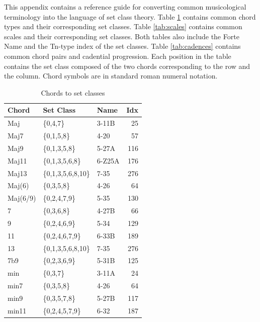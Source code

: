 \documentclass{article}
\begin{document}
This appendix contains a reference guide for converting common
musicological terminology into the language of set class theory. Table
\ref{tab:chords} contains common chord types and their corresponding
set classes. Table \ref{tab:scales} contains common scales and their
corresponding set classes. Both tables also include the Forte Name and
the Tn-type index of the set classes. Table \ref{tab:cadences}
contains common chord pairs and cadential progression. Each position
in the table contains the set class composed of the two chords
corresponding to the row and the column. Chord symbols are in standard
roman numeral notation.
\begin{table}[htb]
\caption{Chords to set classes} \label{tab:chords}
\begin{center}
\begin{tabular}{lllr}
\hline
 Chord           &  Set Class           &  Name    &  Idx  \\
\hline
 Maj             &  \{0,4,7\}           &  3-11B   &   25  \\
 Maj7            &  \{0,1,5,8\}         &  4-20    &   57  \\
 Maj9            &  \{0,1,3,5,8\}       &  5-27A   &  116  \\
 Maj11           &  \{0,1,3,5,6,8\}     &  6-Z25A  &  176  \\
 Maj13           &  \{0,1,3,5,6,8,10\}  &  7-35    &  276  \\
 Maj(6)          &  \{0,3,5,8\}         &  4-26    &   64  \\
 Maj(6/9)        &  \{0,2,4,7,9\}       &  5-35    &  130  \\
\hline
 7               &  \{0,3,6,8\}         &  4-27B   &   66  \\
 9               &  \{0,2,4,6,9\}       &  5-34    &  129  \\
 11              &  \{0,2,4,6,7,9\}     &  6-33B   &  189  \\
 13              &  \{0,1,3,5,6,8,10\}  &  7-35    &  276  \\
 7b9             &  \{0,2,3,6,9\}       &  5-31B   &  125  \\
\hline
 min             &  \{0,3,7\}           &  3-11A   &   24  \\
 min7            &  \{0,3,5,8\}         &  4-26    &   64  \\
 min9            &  \{0,3,5,7,8\}       &  5-27B   &  117  \\
 min11           &  \{0,2,4,5,7,9\}     &  6-32    &  187  \\

\end{tabular}
\end{center}
\end{table}
\end{document}
